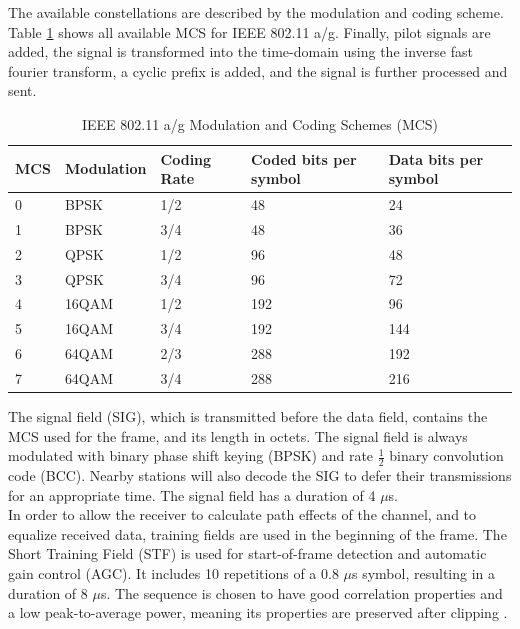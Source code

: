 The available constellations are described by the modulation and coding scheme. Table \ref{tbl:mcs} shows all available MCS for IEEE 802.11 a/g. Finally, pilot signals are added, the signal is transformed into the time-domain using the inverse fast fourier transform, a cyclic prefix is added, and the signal is further processed and sent.

\begin{table}[ht]
	\centering
	\begin{tabular}{|p{2.5cm}|p{2.5cm}|p{2.5cm}|p{2.5cm}|p{2.5cm}|}
		\hline
		\textbf{MCS} & \textbf{Modulation} & \textbf{Coding Rate} & \textbf{Coded bits per symbol} & \textbf{Data bits per symbol} \\ \hline
		0 & BPSK & 1/2 & 48 & 24 \\ \hline
		1 & BPSK & 3/4 & 48 & 36 \\ \hline
		2 & QPSK & 1/2 & 96 & 48 \\ \hline
		3 & QPSK & 3/4 & 96 & 72 \\ \hline
		4 & 16QAM & 1/2 & 192 & 96 \\ \hline
		5 & 16QAM & 3/4 & 192 & 144 \\ \hline
		6 & 64QAM & 2/3 & 288 & 192 \\ \hline
		7 & 64QAM & 3/4 & 288 & 216 \\ \hline
	\end{tabular}
	\caption[IEEE 802.11 a/g Modulation and Coding Schemes]{IEEE 802.11 a/g Modulation and Coding Schemes (MCS) \cite{ieee2012} \label{tbl:mcs}}
\end{table}

The signal field (SIG), which is transmitted before the data field, contains the MCS used for the frame, and its length in octets. The signal field is always modulated with binary phase shift keying (BPSK) and rate $\frac{1}{2}$ binary convolution code (BCC). Nearby stations will also decode the SIG to defer their transmissions for an appropriate time. The signal field has a duration of 4 $\mu$s.\\

In order to allow the receiver to calculate path effects of the channel, and to equalize received data, training fields are used in the beginning of the frame. The Short Training Field (STF) is used for start-of-frame detection and automatic gain control (AGC). It includes 10 repetitions of a 0.8 $\mu$s symbol, resulting in a duration of 8 $\mu$s. The sequence is chosen to have good correlation properties and a low peak-to-average power, meaning its properties are preserved after clipping \cite{perahia2013}.

